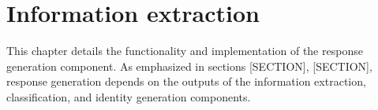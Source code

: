 \chapter{Information extraction}

This chapter details the functionality and implementation of the response generation component. As emphasized in sections [SECTION], [SECTION], response generation depends on the outputs of the information extraction, classification, and identity generation components. 

